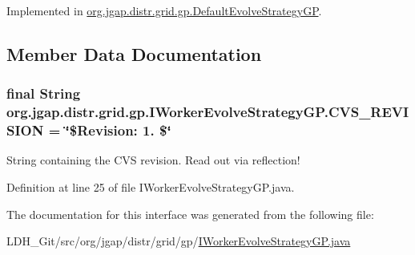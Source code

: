 Implemented in \hyperlink{classorg_1_1jgap_1_1distr_1_1grid_1_1gp_1_1_default_evolve_strategy_g_p_a579c48f4d0f3b5fa3257b47d3877ccfa}{org.\-jgap.\-distr.\-grid.\-gp.\-Default\-Evolve\-Strategy\-G\-P}.



\subsection{Member Data Documentation}
\hypertarget{interfaceorg_1_1jgap_1_1distr_1_1grid_1_1gp_1_1_i_worker_evolve_strategy_g_p_aa5db0afb7a2b8eaf576f0af75f38a9ec}{
\subsubsection[{C\-V\-S\-\_\-\-R\-E\-V\-I\-S\-I\-O\-N}]{\setlength{\rightskip}{0pt plus 5cm}final String org.\-jgap.\-distr.\-grid.\-gp.\-I\-Worker\-Evolve\-Strategy\-G\-P.\-C\-V\-S\-\_\-\-R\-E\-V\-I\-S\-I\-O\-N = \char`\"{}\$Revision\-: 1. \$\char`\"{}\hspace{0.3cm}{\ttfamily [static]}}}\label{interfaceorg_1_1jgap_1_1distr_1_1grid_1_1gp_1_1_i_worker_evolve_strategy_g_p_aa5db0afb7a2b8eaf576f0af75f38a9ec}
String containing the C\-V\-S revision. Read out via reflection! 

Definition at line 25 of file I\-Worker\-Evolve\-Strategy\-G\-P.\-java.



The documentation for this interface was generated from the following file\-:\begin{DoxyCompactItemize}
\item 
L\-D\-H\-\_\-\-Git/src/org/jgap/distr/grid/gp/\hyperlink{_i_worker_evolve_strategy_g_p_8java}{I\-Worker\-Evolve\-Strategy\-G\-P.\-java}\end{DoxyCompactItemize}
